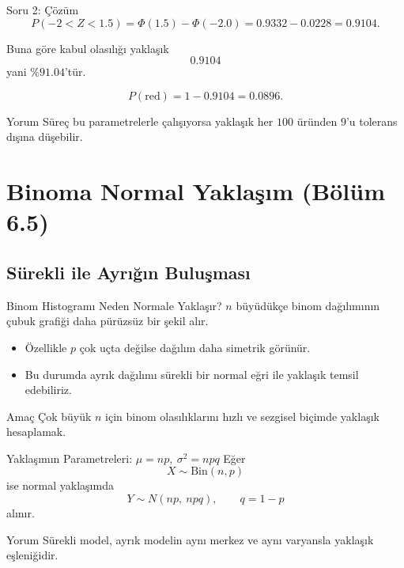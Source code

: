 \documentclass[light]{lutbeamer}
\begin{document}
\begin{frame}{Soru 2: Çözüm}
    \small
    \[
    P(-2<Z<1.5)=\Phi(1.5)-\Phi(-2.0)=0.9332-0.0228=0.9104.
    \]

    Buna göre kabul olasılığı yaklaşık
    \[
    0.9104
    \]
    yani \(\%91.04\)'tür.

    \[
    P(\text{red})=1-0.9104=0.0896.
    \]

    \begin{exampleblock}{Yorum}
        Süreç bu parametrelerle çalışıyorsa yaklaşık her \(100\) üründen \(9\)'u tolerans dışına düşebilir.
    \end{exampleblock}
\end{frame}

\section{Binoma Normal Yaklaşım (Bölüm 6.5)}
\subsection{Sürekli ile Ayrığın Buluşması}

\begin{frame}{Binom Histogramı Neden Normale Yaklaşır?}
    \small
    \(n\) büyüdükçe binom dağılımının çubuk grafiği daha pürüzsüz bir şekil alır.

    \begin{itemize}
        \item Özellikle \(p\) çok uçta değilse dağılım daha simetrik görünür.
        \item Bu durumda ayrık dağılımı sürekli bir normal eğri ile yaklaşık temsil edebiliriz.
    \end{itemize}

    \begin{alertblock}{Amaç}
        Çok büyük \(n\) için binom olasılıklarını hızlı ve sezgisel biçimde yaklaşık hesaplamak.
    \end{alertblock}
\end{frame}

\begin{frame}{Yaklaşımın Parametreleri: \(\mu=np,\ \sigma^2=npq\)}
    \small
    Eğer
    \[
    X \sim \mathrm{Bin}(n,p)
    \]
    ise normal yaklaşımda
    \[
    Y \sim N(np,\ npq), \qquad q=1-p
    \]
    alınır.

    \begin{block}{Yorum}
        Sürekli model, ayrık modelin aynı merkez ve aynı varyansla yaklaşık eşleniğidir.
    \end{block}
\end{frame}
\end{document}
